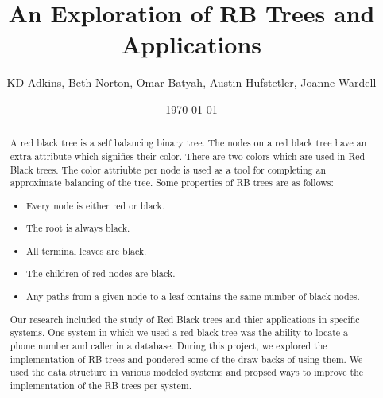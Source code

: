 \documentclass[notitlepage]{report}
\title{An Exploration of RB Trees and Applications}
\author{KD Adkins, Beth Norton, Omar Batyah, Austin Hufstetler, Joanne Wardell}
\date{\today}
\begin{document}
\maketitle
\thispagestyle{empty}

\begin{abstract}
	A red black tree is a self balancing binary tree. The nodes on a red black tree
	have an extra attribute which signifies their color. There are two colors which are
	used in Red Black trees. The color attriubte per node is used as a tool for completing 
	an approximate balancing of the tree. Some properties of RB trees are as follows: 
	\begin{itemize}
		\item Every node is either red or black.
		\item The root is always black.
		\item All terminal leaves are black.
		\item The children of red nodes are black.
		\item Any paths from a given node to a leaf contains the same number of black nodes.
	\end{itemize}
	Our research included the study of Red Black trees and thier applications
	in specific systems. One system in which we used 
	a red black tree was the ability to locate a phone number and caller in a database. 
	During this project, we explored the implementation of RB trees 
	and pondered some of the draw backs of using them. We used the data structure 
	in various modeled systems and propsed ways to improve the implementation of 
	the RB trees per system. 
\end{abstract}
\end{document}
